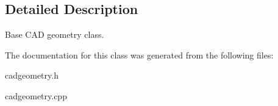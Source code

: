 \subsection{Detailed Description}
Base C\+AD geometry class. 

The documentation for this class was generated from the following files\+:\begin{DoxyCompactItemize}
\item 
cadgeometry.\+h\item 
cadgeometry.\+cpp\end{DoxyCompactItemize}

